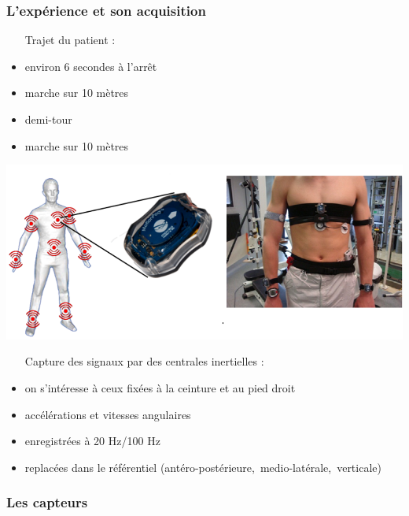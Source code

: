 \documentclass{beamer}
\begin{document}
\begin{frame}
	\frametitle{L'expérience et son acquisition}
    \begin{minipage}{0.59\textwidth}
      	\begin{itemize}
			\item[Trajet] du patient : 
			\item environ 6 secondes à l'arrêt
			\item marche sur 10 mètres
			\item demi-tour
			\item marche sur 10 mètres
		\end{itemize}
    \end{minipage}
    \begin{minipage}{0.39\textwidth}
   		\hspace*{-1.13cm}\includegraphics[scale=.95]{capteurs}
    \end{minipage}
    
	\begin{itemize}
		\item[Capture] des signaux par des centrales inertielles : 
		\item on s'intéresse à ceux fixées à la ceinture et au pied droit
		\item accélérations et vitesses angulaires
		\item enregistrées à 20 Hz/100 Hz
		\item replacées dans le référentiel \mbox{(antéro-postérieure, medio-latérale, verticale)}
	\end{itemize}
\end{frame}

\begin{frame}
	\frametitle{Les capteurs}
	

	
\end{frame}
\end{document}
